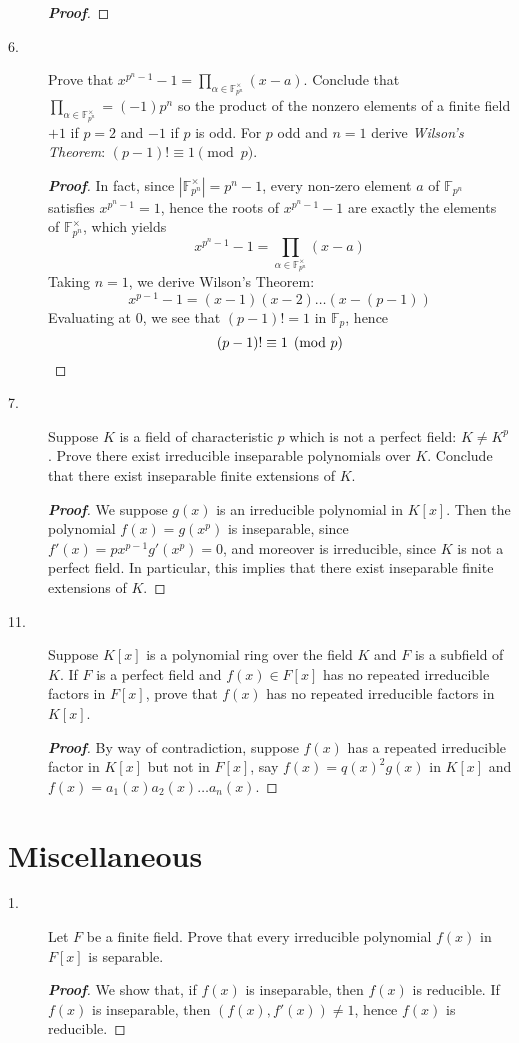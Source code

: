 \documentclass[12pt,leqno]{book}
\theoremstyle{definition}
\newcommand{\F}{\mathbb{F}}
\newenvironment{Proof}{\begin{proof}[\textnormal{\textbf{Proof}}]}{\end{proof}}
\begin{document}
\begin{description}
\begin{Proof}
    \end{Proof}
   \item [6.] Prove that $x^{p^n-1}-1=\prod_{\alpha\in\F_{p^n}^{\times}}(x-a)$. Conclude that $\prod_{\alpha\in\F_{p^n}^{\times}}=(-1)p^n$ so the product of the nonzero elements of a finite field $+1$ if $p=2$ and $-1$ if $p$ is odd. For $p$ odd and $n=1$ derive \textit{Wilson's Theorem}: $(p-1)!\equiv1\pmod{p}$.
    \begin{Proof}
     In fact, since $|\F_{p^n}^{\times}|=p^n-1$, every non-zero element $a$ of $\F_{p^n}$ satisfies $x^{p^n-1}=1$, hence the roots of $x^{p^n-1}-1$ are exactly the elements of $\F_{p^n}^{\times}$, which yields \[x^{p^n-1}-1=\prod_{\alpha\in\F_{p^n}^{\times}}(x-a)\] Taking $n=1$, we derive Wilson's Theorem: \[x^{p-1}-1=(x-1)(x-2)\hdots(x-(p-1))\] Evaluating at 0, we see that $(p-1)!=1$ in $\F_p$, hence \[(p-1)!\equiv1\pmod{p}\qedhere\]
    \end{Proof}
   \item [7.] Suppose $K$ is a field of characteristic $p$ which is not a perfect field: $K\not=K^p$. Prove there exist irreducible inseparable polynomials over $K$. Conclude that there exist inseparable finite extensions of $K$.
    \begin{Proof}
     We suppose $g(x)$ is an irreducible polynomial in $K[x]$. Then the polynomial $f(x)=g(x^p)$ is inseparable, since $f'(x)=px^{p-1}g'(x^p)=0$, and moreover is irreducible, since $K$ is not a perfect field. In particular, this implies that there exist inseparable finite extensions of $K$.
    \end{Proof}
   \item [11.] Suppose $K[x]$ is a polynomial ring over the field $K$ and $F$ is a subfield of $K$. If $F$ is a perfect field and $f(x)\in F[x]$ has no repeated irreducible factors in $F[x]$, prove that $f(x)$ has no repeated irreducible factors in $K[x]$.
    \begin{Proof}
     By way of contradiction, suppose $f(x)$ has a repeated irreducible factor in $K[x]$ but not in $F[x]$, say $f(x)=q(x)^2g(x)$ in $K[x]$ and $f(x)=a_1(x)a_2(x)\hdots a_n(x)$. 
    \end{Proof}
  \end{description}

\section*{Miscellaneous}
\begin{description}
   \item [1.] Let $F$ be a finite field. Prove that every irreducible polynomial $f(x)$ in $F[x]$ is separable. 
    \begin{Proof}
     We show that, if $f(x)$ is inseparable, then $f(x)$ is reducible. If $f(x)$ is inseparable, then $(f(x),f'(x))\not=1$, hence $f(x)$ is reducible.
    \end{Proof}
\end{description}
\end{document}
